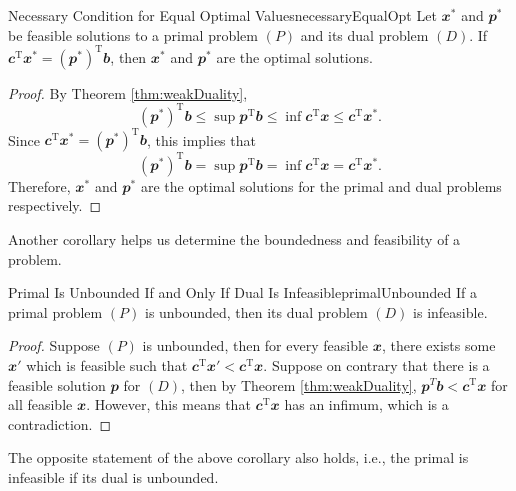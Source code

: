 \documentclass[math, code]{amznotes}
\theoremstyle{remark}
\begin{document}
\begin{corbox}{Necessary Condition for Equal Optimal Values}{necessaryEqualOpt}
    Let $\mathbfit{x}^*$ and $\mathbfit{p}^*$ be feasible solutions to a primal problem $(P)$ and its dual problem $(D)$. If~$\mathbfit{c}^{\mathrm{T}}\mathbfit{x}^* = \left(\mathbfit{p}^*\right)^{\mathrm{T}}\mathbfit{b}$, then $\mathbfit{x}^*$ and $\mathbfit{p}^*$ are the optimal solutions.
    \tcblower
    \begin{proof}
        By Theorem \ref{thm:weakDuality}, 
        \begin{equation*}
            \left(\mathbfit{p}^*\right)^{\mathrm{T}}\mathbfit{b} \leq \sup \mathbfit{p}^{\mathrm{T}}\mathbfit{b} \leq \inf \mathbfit{c}^{\mathrm{T}}\mathbfit{x} \leq \mathbfit{c}^{\mathrm{T}}\mathbfit{x}^*.
        \end{equation*}
        Since $\mathbfit{c}^{\mathrm{T}}\mathbfit{x}^* = \left(\mathbfit{p}^*\right)^{\mathrm{T}}\mathbfit{b}$, this implies that 
        \begin{equation*}
            \left(\mathbfit{p}^*\right)^{\mathrm{T}}\mathbfit{b} = \sup \mathbfit{p}^{\mathrm{T}}\mathbfit{b} = \inf \mathbfit{c}^{\mathrm{T}}\mathbfit{x} = \mathbfit{c}^{\mathrm{T}}\mathbfit{x}^*.
        \end{equation*}
        Therefore, $\mathbfit{x}^*$ and $\mathbfit{p}^*$ are the optimal solutions for the primal and dual problems respectively.
    \end{proof}
\end{corbox}
Another corollary helps us determine the boundedness and feasibility of a problem.
\begin{corbox}{Primal Is Unbounded If and Only If Dual Is Infeasible}{primalUnbounded}
    If a primal problem $(P)$ is unbounded, then its dual problem $(D)$ is infeasible.
    \tcblower
    \begin{proof}
        Suppose $(P)$ is unbounded, then for every feasible $\mathbfit{x}$, there exists some $\mathbfit{x}'$ which is feasible such that $\mathbfit{c}^{\mathrm{T}}\mathbfit{x}' < \mathbfit{c}^{\mathrm{T}}\mathbfit{x}$. Suppose on contrary that there is a feasible solution $\mathbfit{p}$ for $(D)$, then by Theorem \ref{thm:weakDuality}, $\mathbfit{p}^{T}\mathbfit{b} < \mathbfit{c}^{\mathrm{T}}\mathbfit{x}$ for all feasible $\mathbfit{x}$. However, this means that $\mathbfit{c}^{\mathrm{T}}\mathbfit{x}$ has an infimum, which is a contradiction. 
    \end{proof}
\end{corbox}
The opposite statement of the above corollary also holds, i.e., the primal is infeasible if its dual is unbounded.
\end{document}
